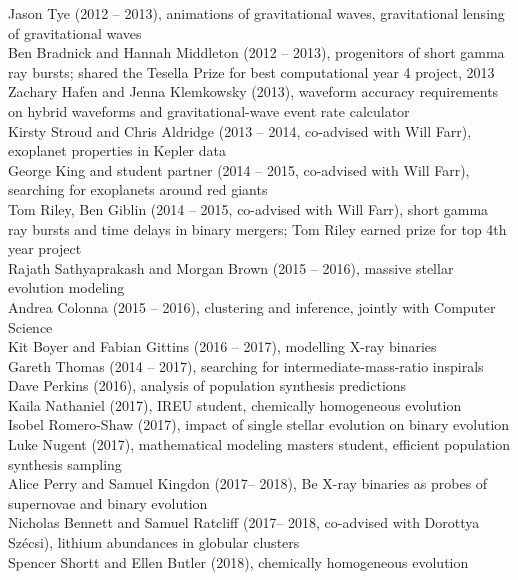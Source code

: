 \documentclass[margin,line]{res}
\begin{document}
\begin{resume}
Jason Tye (2012 -- 2013), animations of gravitational waves, gravitational lensing of gravitational waves\\
Ben Bradnick and Hannah Middleton (2012 -- 2013), progenitors of short gamma ray bursts; shared the Tesella Prize for best computational year 4 project, 2013\\
Zachary Hafen and Jenna Klemkowsky (2013), waveform accuracy requirements on hybrid waveforms and gravitational-wave event rate calculator\\
Kirsty Stroud and Chris Aldridge (2013 -- 2014, co-advised with Will Farr),  exoplanet properties in Kepler data\\
George King and student partner %
(2014 -- 2015, co-advised with Will Farr), searching for exoplanets around red giants\\
Tom Riley, Ben Giblin (2014 -- 2015, co-advised with Will Farr), short gamma ray bursts and time delays in binary mergers; Tom Riley earned prize for top 4th year project\\
Rajath Sathyaprakash and Morgan Brown (2015 -- 2016), massive stellar evolution modeling\\
Andrea Colonna (2015 -- 2016), clustering and inference, jointly with Computer Science\\
Kit Boyer and Fabian Gittins (2016 -- 2017), modelling X-ray binaries\\
Gareth Thomas (2014 -- 2017), searching for intermediate-mass-ratio inspirals\\
Dave Perkins (2016), analysis of population synthesis predictions\\
Kaila Nathaniel (2017), IREU student, chemically homogeneous evolution\\
Isobel Romero-Shaw (2017), impact of single stellar evolution on binary evolution\\
Luke Nugent (2017), mathematical modeling masters student, efficient population synthesis sampling\\
Alice Perry and Samuel Kingdon (2017-- 2018), Be X-ray binaries as probes of supernovae and binary evolution\\
Nicholas Bennett and Samuel Ratcliff (2017-- 2018, co-advised with Dorottya Sz\'{e}csi), lithium abundances in globular clusters\\ 
Spencer Shortt and Ellen Butler (2018), chemically homogeneous evolution\\

\end{resume}
\end{document}

